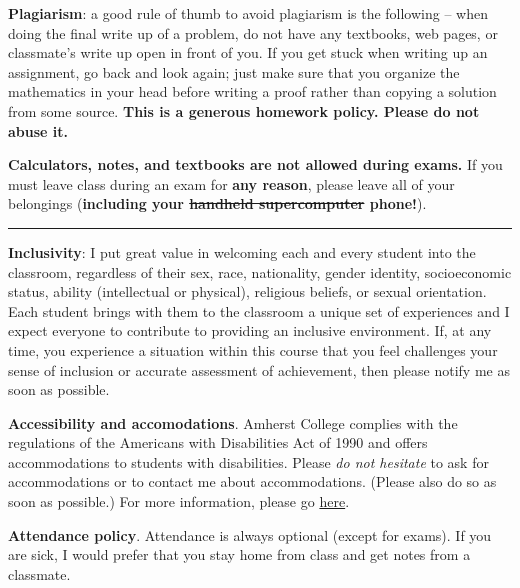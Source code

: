 \documentclass[12pt]{article}
\begin{document}
\bigskip
\noindent\textbf{Plagiarism}: a good rule of thumb to avoid plagiarism is the following -- when doing the final write up of a problem, do not have any textbooks, web pages, or classmate's write up open in front of you. If you get stuck when writing up an assignment, go back and look again; just make sure that you organize the mathematics in your head before writing a proof rather than copying a solution from some source. \textbf{This is a generous homework policy. Please do not abuse it.}

\bigskip
\noindent \textbf{Calculators, notes, and textbooks are not allowed during exams.}
 If you must leave class during an exam for \textbf{any reason}, please leave all of your belongings (\textbf{including your \sout{handheld supercomputer} phone!}).

\smallskip \hrule \medskip

\noindent\textbf{Inclusivity}: I put great value in welcoming each and every student into the classroom, regardless of their
sex, race, nationality, gender identity, socioeconomic status, ability (intellectual or physical), religious beliefs, or sexual orientation. Each student brings with them to the classroom a unique set of experiences and I expect everyone to contribute to providing an inclusive environment. If, at any time, you experience a situation within this course that you feel challenges your sense of inclusion or accurate assessment of achievement, then please notify me as soon as possible.

\bigskip

\noindent\textbf{Accessibility and accomodations}.
Amherst College complies with the regulations of the Americans with Disabilities Act of 1990 and offers accommodations to students with disabilities. Please \emph{do not hesitate} to ask for accommodations or to contact me about accommodations. (Please also do so as soon as possible.) For more information, please go \href{https://www.amherst.edu/offices/student-affairs/accessibility-services}{here}.

\bigskip
\noindent \textbf{Attendance policy}. Attendance is always optional (except for exams).
If you are sick, I would prefer that you stay home from class and get notes from a classmate.
\end{document}
